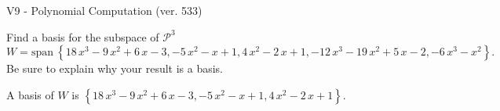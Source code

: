 \begin{exercise}
  \begin{exerciseTitle}V9 - Polynomial Computation (ver. 533)\end{exerciseTitle}
  \begin{exerciseStatement}
    Find a basis for the subspace of \(\mathcal{P}^3\) 
\[W=\mathrm{span}\ \left\{18 \, x^{3} - 9 \, x^{2} + 6 \, x - 3 , -5 \, x^{2} - x + 1 , 4 \, x^{2} - 2 \, x + 1 , -12 \, x^{3} - 19 \, x^{2} + 5 \, x - 2 , -6 \, x^{3} - x^{2}\right\}.\]
 Be sure to explain why your result is a basis.


  \end{exerciseStatement}
  \begin{exerciseAnswer}
   A basis of \(W\) is  \(\left\{18 \, x^{3} - 9 \, x^{2} + 6 \, x - 3 , -5 \, x^{2} - x + 1 , 4 \, x^{2} - 2 \, x + 1\right\}\).
  


  \end{exerciseAnswer}
\end{exercise}